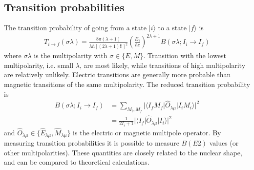 \documentclass[twoside,english]{uiofysmaster/uiofysmaster}
\begin{document}
\subsection{Transition probabilities}
The transition probability of going from a state $|i\rangle$ to a state $|f\rangle$ is
\begin{align}
	T_{i \rightarrow f} (\sigma \lambda) = \frac{8\pi (\lambda + 1)}{\lambda \hbar [(2\lambda + 1)!!]^2} \left( \frac{E_\gamma}{\hbar c} \right)^{2\lambda + 1} B(\sigma \lambda; I_i \rightarrow I_f)
\end{align}
where $\sigma \lambda$ is the multipolarity with $\sigma \in \{ E, M \}$. 
Transition with the lowest multipolarity, i.e. small $\lambda$, are most likely, while transitions of high multipolarity are relatively unlikely. 
Electric transitions are generally more probable than magnetic transitions of the same multipolarity.
The reduced transition probability is
\begin{align}
	B(\sigma \lambda; I_i \rightarrow I_f) &= \sum_{M_i, M_f} | \langle I_f M_f | \hat{O}_{\lambda \mu} | I_i M_i \rangle |^2  \nonumber \\
	&= \frac{1}{2I_i + 1} | \langle I_f | \hat{O}_{\lambda \mu} | I_i \rangle |^2
\end{align}
 and $\hat{O}_{\lambda \mu} \in \{ \hat{E}_{\lambda \mu}, \hat{M}_{\lambda \mu} \}$ is the electric or magnetic multipole operator.
By measuring transition probabilities it is possible to measure $B(E2)$ values (or other multipolarities). 
These quantities are closely related to the nuclear shape, and can be compared to theoretical calculations.
\end{document}
